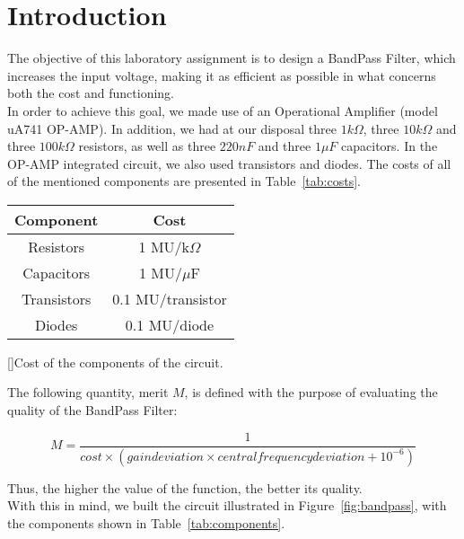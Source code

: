 \section{Introduction}
\label{sec:introduction}

The objective of this laboratory assignment is to design a BandPass Filter, which increases the input voltage, making it as efficient as possible in what concerns both the cost and functioning. \\

In order to achieve this goal, we made use of an Operational Amplifier (model uA741 OP-AMP). In addition, we had at our disposal three $1k\Omega$, three $10k\Omega$ and three $100k\Omega$ resistors, as well as three $220 nF$ and three $1 \mu F$ capacitors. In the OP-AMP integrated circuit, we also used transistors and diodes. The costs of all of the mentioned components are presented in Table~\ref{tab:costs}.

\begin{center}
\begin{tabular}{ | c | c | }
\hline
\textbf{Component} & \textbf{Cost} \\
\hline
Resistors & 1 MU/k$\Omega$ \\  
Capacitors & 1 MU/$\mu$F \\
Transistors & 0.1 MU/transistor \\
Diodes & 0.1 MU/diode \\
\hline   
\end{tabular}
[]{Cost of the components of the circuit.}
\label{tab:costs}
\end{center}

The following quantity, merit $M$, is defined with the purpose of evaluating the quality of the BandPass Filter:

\vspace{-2mm}

\begin{equation}
  M = \frac{1}{cost \times (gain deviation \times central frequency deviation + 10^{-6})}
\end{equation}

\vspace{2mm}

Thus, the higher the value of the function, the better its quality.\\

With this in mind, we built the circuit illustrated in Figure~\ref{fig:bandpass}, with the components shown in Table~\ref{tab:components}.

